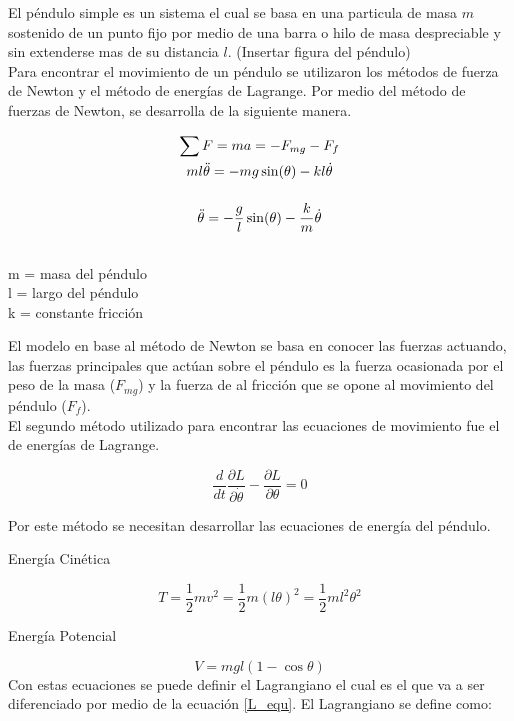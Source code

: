 
El péndulo simple es un sistema el cual se basa en una particula de masa $m$ sostenido de un punto fijo por medio de una barra o hilo de masa despreciable y sin extenderse mas de su distancia $l$. (Insertar figura del péndulo)\\

Para encontrar el movimiento de un péndulo se utilizaron los métodos de fuerza de Newton y el método de energías de Lagrange. Por medio del método de fuerzas de Newton, se desarrolla de la siguiente manera.
\begin{large}
\begin{gather*}
\sum F = ma = -F_{mg} - F_f \\ \bigskip
ml\ddot{\theta} = -mg\sin(\theta) - kl\dot{\theta} \\ \bigskip
\ddot{\theta} = -\dfrac{g}{l}\sin(\theta) - \dfrac{k}{m}\dot{\theta} \\
\end{gather*} 
\end{large}
\begin{flushright}
\begin{small}
m = masa del péndulo\\
l = largo del péndulo\\
k = constante fricción\\
\end{small}
\end{flushright}

El modelo en base al método de Newton se basa en conocer las fuerzas actuando, las fuerzas principales que actúan sobre el péndulo es la fuerza ocasionada por el peso de la masa ($F_{mg}$) y la fuerza de al fricción que se opone al movimiento del péndulo ($F_f$).\\

El segundo método utilizado para encontrar las ecuaciones de movimiento fue el de energías de Lagrange.
\begin{large}
\begin{equation} \label{L_equ}
\dfrac{d}{dt} \dfrac{\partial L}{\partial \dot{\theta}} - \dfrac{\partial L}{\partial\theta} = 0
\end{equation}
\end{large}
Por este método se necesitan desarrollar las ecuaciones de energía del péndulo.\\
\begin{flushleft}
{\large Energía Cinética}
\end{flushleft}
\begin{equation} \label{T_equ}
T = \frac{1}{2}mv^2 = \frac{1}{2}m(l\theta)^2 = \frac{1}{2}ml^2\theta^2 
\end{equation}
\begin{flushleft}
{\large Energía Potencial}
\end{flushleft}
\begin{equation} \label{V_equ}
V = mgl(1-\cos \theta)
\end{equation}
Con estas ecuaciones se puede definir el Lagrangiano el cual es el que va a ser diferenciado por medio de la ecuación \ref{L_equ}. El Lagrangiano se define como:

